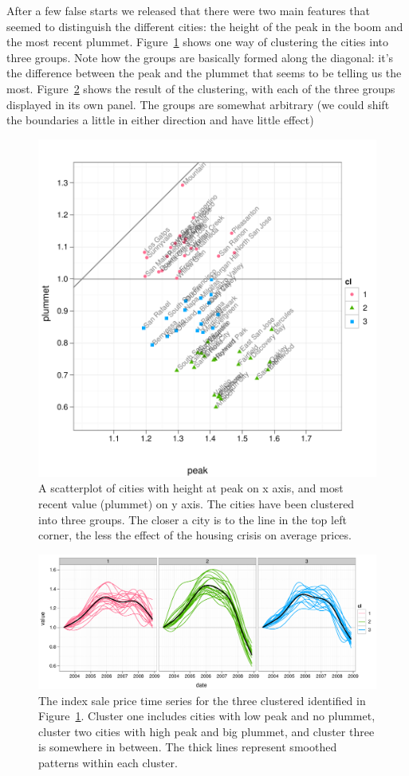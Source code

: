 \documentclass[oneside]{article}
\begin{document}
After a few false starts we released that there were two main features that seemed to distinguish the different cities: the height of the peak in the boom and the most recent plummet.  Figure~\ref{fig:clustering} shows one way of clustering the cities into three groups.  Note how the groups are basically formed along the diagonal: it's the difference between the peak and the plummet that seems to be telling us the most.  Figure~\ref{fig:clustered} shows the result of the clustering, with each of the three groups displayed in its own panel.  The groups are somewhat arbitrary (we could shift the boundaries a little in either direction and have little effect)

\begin{figure}[htbp]
  \centering
    \includegraphics[width=0.7 \linewidth]{cities-clustering}
  \caption{A scatterplot of cities with height at peak on x axis, and most recent value (plummet) on y axis.  The cities have been clustered into three groups.  The closer a city is to the line in the top left corner, the less the effect of the housing crisis on average prices.}
  \label{fig:clustering}
\end{figure}

\begin{figure}[htbp]
  \centering
  \includegraphics[width=\linewidth]{cities-indexed-clustered}
  \caption{The index sale price time series for the three clustered identified in Figure~\ref{fig:clustering}.  Cluster one includes cities with low peak and no plummet, cluster two cities with high peak and big plummet, and cluster three is somewhere in between.  The thick lines represent smoothed patterns within each cluster.}
  \label{fig:clustered}
\end{figure}
\end{document}
